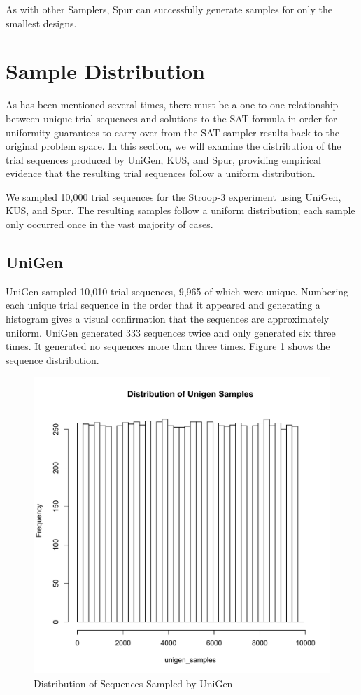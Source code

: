As with other Samplers, Spur can successfully generate samples for only the smallest designs.


\section{Sample Distribution}

As has been mentioned several times, there must be a one-to-one relationship between unique trial sequences and solutions to the SAT formula in order for uniformity guarantees to carry over from the SAT sampler results back to the original problem space. In this section, we will examine the distribution of the trial sequences produced by UniGen, KUS, and Spur, providing empirical evidence that the resulting trial sequences follow a uniform distribution.

We sampled 10,000 trial sequences for the Stroop-3 experiment using UniGen, KUS, and Spur. The resulting samples follow a uniform distribution; each sample only occurred once in the vast majority of cases.

\subsection{UniGen}

UniGen sampled 10,010 trial sequences, 9,965 of which were unique. Numbering each unique trial sequence in the order that it appeared and generating a histogram gives a visual confirmation that the sequences are approximately uniform. UniGen generated 333 sequences twice and only generated six three times. It generated no sequences more than three times. Figure \ref{fig:unigen_samples} shows the sequence distribution.

\begin{figure}[b]
\centering
\centerline{\includegraphics[origin=c,width=12cm]{../figures/unigen-samples.pdf}}
\caption{Distribution of Sequences Sampled by UniGen}
\label{fig:unigen_samples}
\end{figure}


